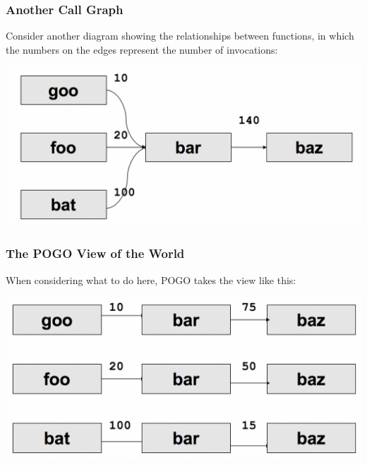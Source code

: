 \begin{frame}
\frametitle{Another Call Graph}


Consider another diagram showing the relationships between functions, in which the numbers on the edges represent the number of invocations:

\begin{center}
	\includegraphics[width=\textwidth]{images/callpaths2.png}
\end{center}

\end{frame}



\begin{frame}
\frametitle{The POGO View of the World}

When considering what to do here, POGO takes the view like this:

\begin{center}
	\includegraphics[width=\textwidth]{images/callpaths3.png}
\end{center}

\end{frame}



